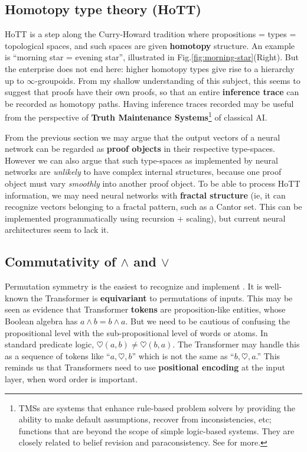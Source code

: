 \documentclass[runningheads]{llncs}
\begin{document}
\subsection{Homotopy type theory (HoTT)}

HoTT is a step along the Curry-Howard tradition where propositions = types = topological spaces, and such spaces are given \textbf{homotopy} structure.  An example is ``morning star = evening star'', illustrated in Fig.\ref{fig:morning-star}(Right).  But the enterprise does not end here: higher homotopy types give rise to a hierarchy up to $\infty$-groupoids.  From my shallow understanding of this subject, this seems to suggest that proofs have their own proofs, so that an entire \textbf{inference trace} can be recorded as homotopy paths.  Having inference traces recorded may be useful from the perspective of \textbf{Truth Maintenance Systems}\footnote{TMSs are systems that enhance rule-based problem solvers by providing the ability to make default assumptions, recover from inconsistencies, etc; functions that are beyond the scope of simple logic-based systems.  They are closely related to belief revision and paraconsistency.  See \cite{wikiTMS} for more.} of classical AI.

From the previous section we may argue that the output vectors of a neural network can be regarded as \textbf{proof objects} in their respective type-spaces.  However we can also argue that such type-spaces as implemented by neural networks are \textit{unlikely} to have complex internal structures, because one proof object must vary \textit{smoothly} into another proof object.  To be able to process HoTT information, we may need neural networks with \textbf{fractal structure} (ie, it can recognize vectors belonging to a fractal pattern, such as a Cantor set.  This can be implemented programmatically using recursion + scaling), but current neural architectures seem to lack it.

\subsection{Commutativity of $\wedge$ and $\vee$}

Permutation symmetry is the easiest to recognize and implement \cite{Zaheer2017} \cite{Qi2017}.  It is well-known the Transformer \cite{Vaswani2017} is \textbf{equivariant} to permutations of inputs.  This may be seen as evidence that Transformer \textbf{tokens} are proposition-like entities, whose Boolean algebra has $a \wedge b = b \wedge a$.  But we need to be cautious of confusing the propositional level with the sub-propositional level of words or atoms.  In standard predicate logic, $\heartsuit(a,b) \neq \heartsuit(b,a)$.  The Transformer may handle this as a sequence of tokens like ``$a , \heartsuit , b$'' which is not the same as ``$b , \heartsuit , a$.''  This reminds us that Transformers need to use \textbf{positional encoding} at the input layer, when word order is important.
\end{document}

